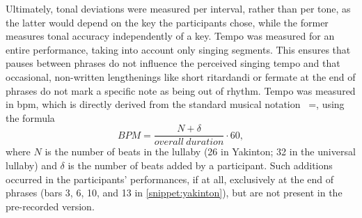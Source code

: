 Ultimately, tonal deviations were measured per interval, rather than per tone, as the latter would depend on the key the participants chose, while the former measures tonal accuracy independently of a key.
Tempo was measured for an entire performance, taking into account only singing segments.
This ensures that pauses between phrases do not influence the perceived singing tempo and that occasional, non-written lengthenings like short ritardandi or fermate at the end of phrases do not mark a specific note as being out of rhythm.
Tempo was measured in \acf{bpm}, which is directly derived from the standard musical notation \musQuarter~=, using the formula
%
\begin{equation}
	\label{eq:bpm}
	BPM = \frac{N + \delta}{overall\ duration} \cdot 60,
\end{equation}
\noindent
%
where $N$ is the number of beats in the lullaby (26 in Yakinton; 32 in the universal lullaby) and $\delta$ is the number of beats added by a participant.
Such additions occurred in the participants' performances, if at all, exclusively at the end of phrases (bars 3, 6, 10, and 13 in \cref{snippet:yakinton}), but are not present in the pre-recorded version.

